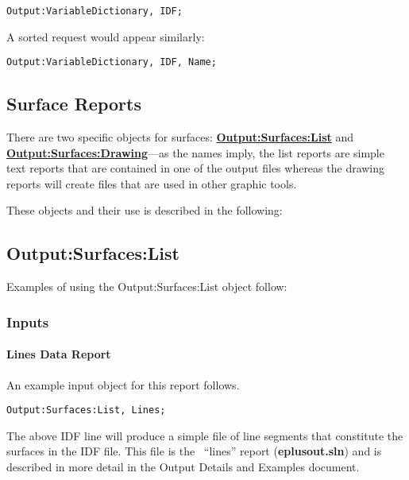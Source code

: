 \begin{lstlisting}
Output:VariableDictionary, IDF;
\end{lstlisting}

A sorted request would appear similarly:

\begin{lstlisting}
Output:VariableDictionary, IDF, Name;
\end{lstlisting}

\subsection{Surface Reports}\label{surface-reports}

There are two specific objects for surfaces: \textbf{\hyperref[outputsurfaceslist]{Output:Surfaces:List}} and \textbf{\hyperref[outputsurfacesdrawing]{Output:Surfaces:Drawing}}---as the names imply, the list reports are simple text reports that are contained in one of the output files whereas the drawing reports will create files that are used in other graphic tools.

These objects and their use is described in the following:

\subsection{Output:Surfaces:List}\label{outputsurfaceslist}

Examples of using the Output:Surfaces:List object follow:

\subsubsection{Inputs}\label{inputs-040}

\paragraph{Lines Data Report}\label{lines-data-report}

An example input object for this report follows.

\begin{lstlisting}
Output:Surfaces:List, Lines;
\end{lstlisting}

The above IDF line will produce a simple file of line segments that constitute the surfaces in the IDF file. This file is the~ ``lines'' report (\textbf{eplusout.sln}) and is described in more detail in the Output Details and Examples document.

